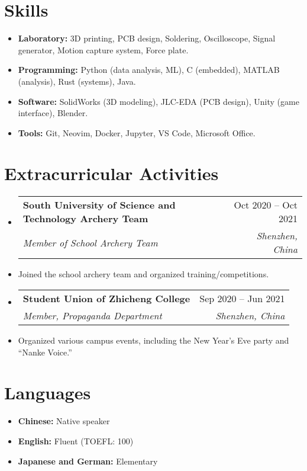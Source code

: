\documentclass[letterpaper,11pt]{article}
\makeatletter
\newcommand{\resumeItem}[1]{
  \item\small{
    {#1 \vspace{-2pt}}
  }
}
\newcommand{\resumeSubheading}[4]{
  \vspace{-2pt}\item
  \begin{tabular*}{0.97\textwidth}[t]{l@{\extracolsep{\fill}}r}
    \textbf{#1} & #2 \\
    \textit{\small#3} & \textit{\small #4} \\
  \end{tabular*}\vspace{-7pt}
}
\newcommand{\resumeSubHeadingListStart}{\begin{itemize}[leftmargin=0.15in, label={}]}
\newcommand{\resumeSubHeadingListEnd}{\end{itemize}}
\newcommand{\resumeItemListStart}{\begin{itemize}}
\newcommand{\resumeItemListEnd}{\end{itemize}\vspace{-5pt}}
\makeatother
\begin{document}
\section{Skills}
\resumeItemListStart
  \resumeItem{\textbf{Laboratory:} 3D printing, PCB design, Soldering, Oscilloscope, Signal generator, 
    Motion capture system, Force plate.}
  \resumeItem{\textbf{Programming:} Python (data analysis, ML), C (embedded), MATLAB (analysis), Rust (systems), Java.}
  \resumeItem{\textbf{Software:} SolidWorks (3D modeling), JLC-EDA (PCB design), Unity (game interface), Blender.}
  \resumeItem{\textbf{Tools:} Git, Neovim, Docker, Jupyter, VS Code, Microsoft Office.}
\resumeItemListEnd

\section{Extracurricular Activities}
\vspace{3pt}
\resumeSubHeadingListStart

\resumeSubheading
{South University of Science and Technology Archery Team}{Oct 2020 -- Oct 2021}
{Member of School Archery Team}{Shenzhen, China}
\resumeItem{Joined the school archery team and organized training/competitions.}

\resumeSubheading
{Student Union of Zhicheng College}{Sep 2020 -- Jun 2021}
{Member, Propaganda Department}{Shenzhen, China}
\resumeItem{Organized various campus events, including the New Year's Eve party and “Nanke Voice.”}

\resumeSubHeadingListEnd

\section{Languages}
\vspace{3pt}
\resumeItemListStart
  \resumeItem{\textbf{Chinese:} Native speaker}
  \resumeItem{\textbf{English:} Fluent (TOEFL: 100)}
  \resumeItem{\textbf{Japanese and German:} Elementary}
\resumeItemListEnd
\end{document}
